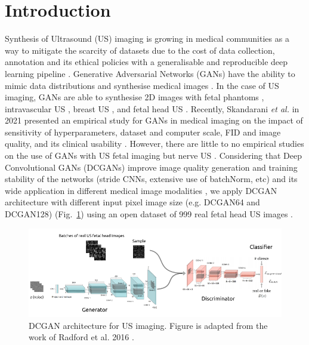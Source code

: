 \documentclass[runningheads]{llncs}
\begin{document}
\section{Introduction}
Synthesis of Ultrasound (US) imaging is growing in medical communities as a way to mitigate the scarcity of datasets due to the cost of data collection, annotation and its ethical policies with a generalisable and reproducible deep learning pipeline \cite{fiorentino2022-DLUSFetalImaging}.
Generative Adversarial Networks (GANs) have the ability to mimic data distributions and synthesise medical images \cite{KAZEMINIA2020gans, skandarani2021gans}.
In the case of US imaging, GANs are able to synthesise 2D images with fetal phantoms \cite{hu2017-gans-us}, intravascular US \cite{tom-gans-us}, breast US \cite{fujioka2019-gans-us}, and fetal head US \cite{lee2022-gans-us}.
Recently, Skandarani \textit{et al.} in 2021 presented an empirical study for GANs in medical imaging on the impact of sensitivity of hyperparameters, dataset and computer scale, FID and image quality, and its clinical usability \cite{skandarani2021gans}.
However, there are little to no empirical studies on the use of GANs with US fetal imaging but nerve US \cite{kumar2021empirical}.
Considering that Deep Convolutional GANs (DCGANs) improve image quality generation and training stability of the networks (stride CNNs, extensive use of batchNorm, etc) \cite{radford2016unsupervised} and its wide application in different medical image modalities \cite{radford2016unsupervised,KAZEMINIA2020gans, skandarani2021gans, fujioka2019-gans-us}, we apply DCGAN architecture \cite{radford2016unsupervised} with different input pixel image size (e.g. DCGAN64 and DCGAN128) (Fig.~\ref{fig1}) using an open dataset of 999 real fetal head US images \cite{vandenHeuvel2018}.

\begin{figure}
\includegraphics[width=\textwidth]{../figures/dcgan-based-network/versions/drawing-v02.png}%
\caption{DCGAN architecture for US imaging. Figure is adapted from the work of Radford et al. 2016 \cite{radford2016unsupervised}.} \label{fig1}
\end{figure}
\end{document}
